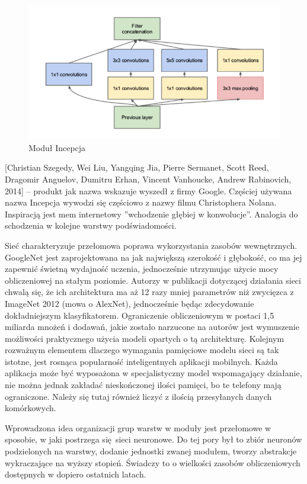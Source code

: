 \documentclass[12pt,a4paper,twoside,titlepage,openright]{book}
\begin{document}
\begin{figure}[ht]
	\centering
			\includegraphics[resolution=100, scale=0.7]{inceptionModule.png}
		\caption{Moduł Incepcja}
\end{figure}

[Christian Szegedy, Wei Liu, Yangqing Jia, Pierre Sermanet, Scott Reed, Dragomir Anguelov, Dumitru Erhan, Vincent Vanhoucke, Andrew Rabinovich, 2014] -- produkt jak nazwa wskazuje wyszedł z firmy Google. Częściej używana nazwa Incepcja wywodzi się częściowo z nazwy filmu Christophera Nolana. Inspiracją jest mem internetowy ''wchodzenie głębiej w konwolucje''. Analogia do schodzenia w kolejne warstwy podświadomości.\cite{siteDeeper}

Sieć charakteryzuje przełomowa poprawa wykorzystania zasobów wewnętrznych. GoogleNet jest zaprojektowana na jak największą szerokość i głębokość, co ma jej zapewnić świetną wydajność uczenia, jednocześnie utrzymując użycie mocy obliczeniowej na stałym poziomie. Autorzy w publikacji dotyczącej działania sieci chwalą się, że ich architektura ma aż 12 razy mniej parametrów niż zwycięzca z ImageNet 2012 (mowa o AlexNet), jednocześnie będąc zdecydowanie dokładniejszym klasyfikatorem. Ograniczenie obliczeniowym w postaci 1,5 miliarda mnożeń i dodawań, jakie zostało narzucone na autorów jest wymuszenie możliwości praktycznego użycia modeli opartych o tą architekturę. Kolejnym rozważnym elementem dlaczego wymagania pamięciowe modelu sieci są tak istotne, jest rosnąca popularność inteligentnych aplikacji mobilnych. Każda aplikacja może być wyposażona w specjalistyczny model wspomagający działanie, nie można jednak zakładać nieskończonej ilości pamięci, bo te telefony mają ograniczone. Należy się tutaj również liczyć z ilością przesyłanych danych komórkowych. 

Wprowadzona idea organizacji grup warstw w moduły jest przełomowe w sposobie, w jaki postrzega się sieci neuronowe. Do tej pory był to zbiór neuronów podzielonych na warstwy, dodanie jednostki zwanej modułem, tworzy abstrakcje wykraczające na wyższy stopień. Świadczy to o wielkości zasobów obliczeniowych dostępnych w dopiero ostatnich latach.
\end{document}
